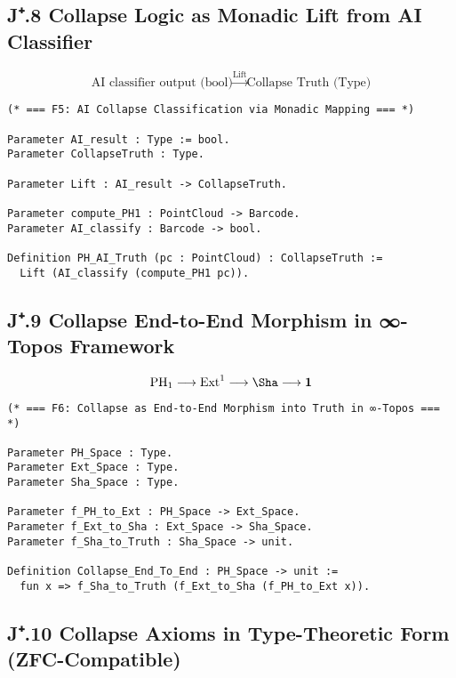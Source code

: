\subsection*{J⁺.8 Collapse Logic as Monadic Lift from AI Classifier}

\[
\text{AI classifier output (bool)} \xrightarrow{\text{Lift}} \text{Collapse Truth (Type)}
\]

\begin{lstlisting}[language=Coq, caption=Monadic Mapping from AI Classifier to Collapse Truth]
(* === F5: AI Collapse Classification via Monadic Mapping === *)

Parameter AI_result : Type := bool.
Parameter CollapseTruth : Type.

Parameter Lift : AI_result -> CollapseTruth.

Parameter compute_PH1 : PointCloud -> Barcode.
Parameter AI_classify : Barcode -> bool.

Definition PH_AI_Truth (pc : PointCloud) : CollapseTruth :=
  Lift (AI_classify (compute_PH1 pc)).
\end{lstlisting}

\subsection*{J⁺.9 Collapse End-to-End Morphism in ∞-Topos Framework}

\[
\mathrm{PH}_1 \longrightarrow \mathrm{Ext}^1 \longrightarrow \Sha \longrightarrow \mathbf{1}
\]

\begin{lstlisting}[language=Coq, caption=Collapse Structure as End-to-End Morphism into Truth]
(* === F6: Collapse as End-to-End Morphism into Truth in ∞-Topos === *)

Parameter PH_Space : Type.
Parameter Ext_Space : Type.
Parameter Sha_Space : Type.

Parameter f_PH_to_Ext : PH_Space -> Ext_Space.
Parameter f_Ext_to_Sha : Ext_Space -> Sha_Space.
Parameter f_Sha_to_Truth : Sha_Space -> unit.

Definition Collapse_End_To_End : PH_Space -> unit :=
  fun x => f_Sha_to_Truth (f_Ext_to_Sha (f_PH_to_Ext x)).
\end{lstlisting}

\subsection*{J⁺.10 Collapse Axioms in Type-Theoretic Form (ZFC-Compatible)}

